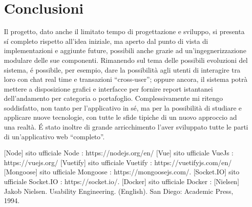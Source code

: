 \documentclass{report}
\begin{document}
\section{Conclusioni}
Il progetto, dato anche il limitato tempo di progettazione e sviluppo, si presenta sí completo rispetto all’idea iniziale, ma aperto dal punto di vista di implementazioni e aggiunte future, possibili anche grazie ad un’ingegnerizzazione modulare delle sue componenti.
\newline \newline
Rimanendo sul tema delle possibili evoluzioni del sistema, é possibile, per esempio, dare la possibilità agli utenti di interagire tra loro con chat real time e transazioni “cross-user”; oppure ancora, il sistema potrà mettere a disposizione grafici e interfacce per fornire report istantanei dell’andamento per categoria o portafoglio.
\newline \newline
Complessivamente mi ritengo soddisfatto, non tanto per l’applicativo in sé, ma per la possibilità di studiare e applicare nuove tecnologie, con tutte le sfide tipiche di un nuovo approccio ad una realtà.
É stato inoltre di grande arricchimento l’aver sviluppato tutte le parti di un’applicativo web “completo”.



[Node] sito ufficiale Node : https://nodejs.org/en/
[Vue] sito ufficiale VueJs : https://vuejs.org/
[Vuetify] sito ufficiale Vuetify : https://vuetifyjs.com/en/
[Mongoose] sito ufficiale Mongoose : https://mongoosejs.com/.
[Socket.IO] sito ufficiale Socket.IO : https://socket.io/.
[Docker] sito ufficiale Docker :
[Nielsen] Jakob Nielsen. Usability Engineering. (English). San Diego: Academic Press,
1994.
\end{document}

